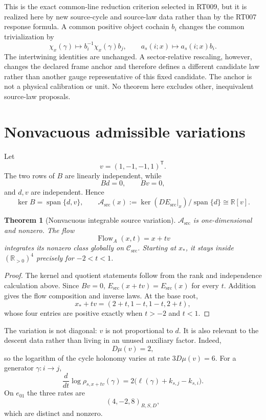 \documentclass[11pt]{article}
\newtheorem{theorem}{Theorem}
\newcommand{\R}{\mathbb{R}}
\newcommand{\Csrc}{\mathcal{C}_{\mathrm{src}}}
\newcommand{\Asrc}{\mathcal{A}_{\mathrm{src}}}
\begin{document}
This is the exact common-line reduction criterion selected in RT009, but it is
realized here by new source-cycle and source-law data rather than by the RT007
response formula.  A common positive object cochain $b_i$ changes the common
trivialization by
\[
\chi_x(\gamma)\mapsto b_i^{-1}\chi_x(\gamma)b_j,
\qquad a_s(i;x)\mapsto a_s(i;x)b_i.
\]
The intertwining identities are unchanged.  A sector-relative rescaling,
however, changes the declared frame anchor and therefore defines a different
candidate law rather than another gauge representative of this fixed
candidate.  The anchor is not a physical calibration or unit.  No theorem
here excludes other, inequivalent source-law proposals.

\section{Nonvacuous admissible variations}

Let
\[
v=(1,-1,-1,1)^{\mathsf T}.
\]
The two rows of $B$ are linearly independent, while
\[
Bd=0,\qquad Bv=0,
\]
and $d,v$ are independent.  Hence
\[
\ker B=\operatorname{span}\{d,v\},\qquad
\Asrc(x):=\ker(DE_{\mathrm{src}}|_x)/\operatorname{span}\{d\}
\cong\R[v].
\]

\begin{theorem}[Nonvacuous integrable source variation]
\label{thm:variation}
$\Asrc$ is one-dimensional and nonzero.  The flow
\[
\operatorname{Flow}_{A}(x,t)=x+t v
\]
integrates its nonzero class globally on $\Csrc$.  Starting at $x_*$, it stays
inside $(\R_{>0})^4$ precisely for $-2<t<1$.
\end{theorem}

\begin{proof}
The kernel and quotient statements follow from the rank and independence
calculation above.  Since $Bv=0$,
$E_{\mathrm{src}}(x+tv)=E_{\mathrm{src}}(x)$ for every $t$.  Addition gives
the flow composition and inverse laws.  At the base root,
\[
x_*+tv=(2+t,1-t,1-t,2+t),
\]
whose four entries are positive exactly when $t>-2$ and $t<1$.
\end{proof}

The variation is not diagonal: $v$ is not proportional to $d$.  It is also
relevant to the descent data rather than living in an unused auxiliary factor.
Indeed,
\[
D\mu(v)=2,
\]
so the logarithm of the cycle holonomy varies at rate $3D\mu(v)=6$.  For a
generator $\gamma:i\to j$,
\[
\frac{d}{dt}\log\rho_{s,x+tv}(\gamma)
=2\bigl(\ell(\gamma)+k_{s,j}-k_{s,i}\bigr).
\]
On $e_{01}$ the three rates are
\[
(4,-2,8)_{R,S,D},
\]
which are distinct and nonzero.
\end{document}
